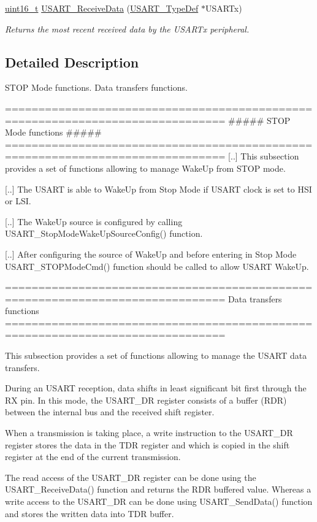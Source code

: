 \begin{DoxyCompactItemize}
\hyperlink{stdint_8h_a273cf69d639a59973b6019625df33e30}{uint16\-\_\-t} \hyperlink{group___u_s_a_r_t___group2_gac67a91845b0b1d54d31bdfb1c5e9867c}{U\-S\-A\-R\-T\-\_\-\-Receive\-Data} (\hyperlink{struct_u_s_a_r_t___type_def}{U\-S\-A\-R\-T\-\_\-\-Type\-Def} $\ast$U\-S\-A\-R\-Tx)
\begin{DoxyCompactList}\small\item\em Returns the most recent received data by the U\-S\-A\-R\-Tx peripheral. \end{DoxyCompactList}\end{DoxyCompactItemize}


\subsection{Detailed Description}
S\-T\-O\-P Mode functions. Data transfers functions.

\begin{DoxyVerb} ===============================================================================
                        ##### STOP Mode functions #####
 ===============================================================================
    [..] This subsection provides a set of functions allowing to manage 
         WakeUp from STOP mode.

    [..] The USART is able to WakeUp from Stop Mode if USART clock is set to HSI
         or LSI.
         
    [..] The WakeUp source is configured by calling USART_StopModeWakeUpSourceConfig()
         function.
         
    [..] After configuring the source of WakeUp and before entering in Stop Mode 
         USART_STOPModeCmd() function should be called to allow USART WakeUp.\end{DoxyVerb}


\begin{DoxyVerb} ===============================================================================
                            Data transfers functions
 ===============================================================================  

  This subsection provides a set of functions allowing to manage the USART data 
  transfers.
  
  During an USART reception, data shifts in least significant bit first through 
  the RX pin. In this mode, the USART_DR register consists of a buffer (RDR) 
  between the internal bus and the received shift register.

  When a transmission is taking place, a write instruction to the USART_DR register 
  stores the data in the TDR register and which is copied in the shift register 
  at the end of the current transmission.

  The read access of the USART_DR register can be done using the USART_ReceiveData()
  function and returns the RDR buffered value. Whereas a write access to the USART_DR 
  can be done using USART_SendData() function and stores the written data into 
  TDR buffer.\end{DoxyVerb}
 

